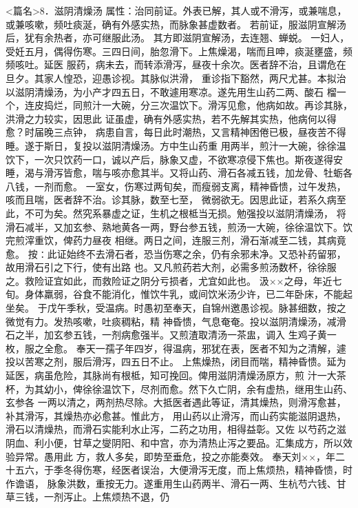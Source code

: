 \documentclass[a4paper,12pt,UTF8,twoside]{ctexbook}
\begin{document}
<篇名>8．滋阴清燥汤
属性：治同前证。外表已解，其人或不滑泻，或兼喘息，或兼咳嗽，频吐痰涎，确有外感实热，而脉象甚虚数者。 
若前证，服滋阴宣解汤后，犹有余热者，亦可继服此汤。 
其方即滋阴宣解汤，去连翘、蝉蜕。 
一妇人，受妊五月，偶得伤寒。三四日间，胎忽滑下。上焦燥渴，喘而且呻，痰涎壅盛，频频咳吐。延医 
服药，病未去，而转添滑泻，昼夜十余次。医者辞不治，且谓危在旦夕。其家人惶恐，迎愚诊视。其脉似洪滑， 
重诊指下豁然，两尺尤甚。本拟治以滋阴清燥汤，为小产才四五日，不敢遽用寒凉。遂先用生山药二两、酸石 
榴一个，连皮捣烂，同煎汁一大碗，分三次温饮下。滑泻见愈，他病如故。再诊其脉，洪滑之力较实，因思此 
证虽虚，确有外感实热，若不先解其实热，他病何以得愈？时届晚三点钟， 
病患自言，每日此时潮热，又言精神困倦已极，昼夜苦不得睡。遂于斯日，复投以滋阴清燥汤。方中生山药重 
用两半，煎汁一大碗，徐徐温饮下，一次只饮药一口，诚以产后，脉象又虚，不欲寒凉侵下焦也。斯夜遂得安 
睡，渴与滑泻皆愈，喘与咳亦愈其半。又将山药、滑石各减五钱，加龙骨、牡蛎各八钱，一剂而愈。 
一室女，伤寒过两旬矣，而瘦弱支离，精神昏愦，过午发热，咳而且喘，医者辞不治。诊其脉，数至七至， 
微弱欲无。因思此证，若系久病至此，不可为矣。然究系暴虚之证，生机之根柢当无损。勉强投以滋阴清燥汤， 
将滑石减半，又加玄参、熟地黄各一两，野台参五钱，煎汤一大碗，徐徐温饮下。饮完煎滓重饮，俾药力昼夜 
相继。两日之间，连服三剂，滑石渐减至二钱，其病竟愈。 
按∶此证始终不去滑石者，恐当伤寒之余，仍有余邪未净。又恐补药留邪，故用滑石引之下行，使有出路 
也。又凡煎药若大剂，必需多煎汤数杯，徐徐服之。救险证宜如此，而救险证之阴分亏损者，尤宜如此也。 
汲××之母，年近七旬。身体羸弱，谷食不能消化，惟饮牛乳，或间饮米汤少许，已二年卧床，不能起坐矣。 
于戊午季秋，受温病。时愚初至奉天，自锦州邀愚诊视。脉甚细数，按之微觉有力。发热咳嗽，吐痰稠粘，精 
神昏愦，气息奄奄。投以滋阴清燥汤，减滑石之半，加玄参五钱，一剂病愈强半。又煎渣取清汤一茶盅，调入 
生鸡子黄一枚，服之全愈。 
奉天一孺子年四岁，得温病，邪犹在表，医者不知为之清解，遽投以苦寒之剂，服后滑泻，四五日不止。 
上焦燥热，闭目而喘，精神昏愦。延为延医，病虽危险，其脉尚有根柢，知可挽回。俾用滋阴清燥汤原方，煎 
汁一大茶杯，为其幼小，俾徐徐温饮下，尽剂而愈。然下久亡阴，余有虚热，继用生山药、玄参各 
一两以清之，两剂热尽除。大抵医者遇此等证，清其燥热，则滑泻愈甚，补其滑泻，其燥热亦必愈甚。惟此方， 
用山药以止滑泻，而山药实能滋阴退热，滑石以清燥热，而滑石实能利水止泻，二药之功用，相得益彰。又佐 
以芍药之滋阴血、利小便，甘草之燮阴阳、和中宫，亦为清热止泻之要品。汇集成方，所以效验异常。愚用此 
方，救人多矣，即势至垂危，投之亦能奏效。 
奉天刘××，年二十五六，于季冬得伤寒，经医者误治，大便滑泻无度，而上焦烦热，精神昏愦，时作谵语， 
脉象洪数，重按无力。遂重用生山药两半、滑石一两、生杭芍六钱、甘草三钱，一剂泻止。上焦烦热不退，仍 
\end{document}
